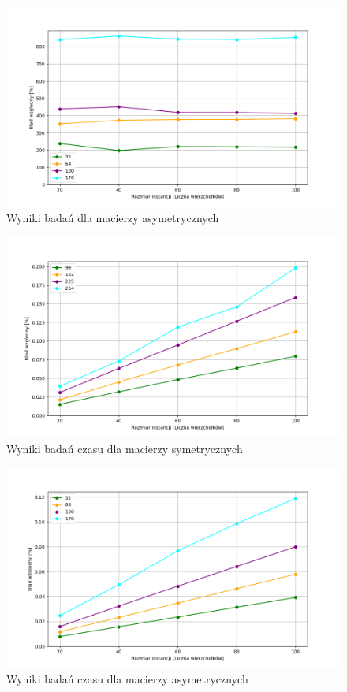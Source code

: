 \documentclass{article}
\begin{document}
        \begin{figure}[ht]
          \centering
          \includegraphics[width=\textwidth]{src/plots/asymAnEpoch.png}
          \caption{Wyniki badań dla macierzy asymetrycznych}
          \label{fig:asymEpoch}
        \end{figure}
        \FloatBarrier
        
        \FloatBarrier
        \begin{figure}[ht]
          \centering
          \includegraphics[width=\textwidth]{src/plots/symAnEpochTime.png}
          \caption{Wyniki badań czasu  dla macierzy symetrycznych}
          \label{fig:symEpochT}
        \end{figure}
        \begin{figure}[ht]
          \centering
          \includegraphics[width=\textwidth]{src/plots/asymAnEpochTime.png}
          \caption{Wyniki badań czasu dla macierzy asymetrycznych}
          \label{fig:asymEpochT}
        \end{figure}
\end{document}
